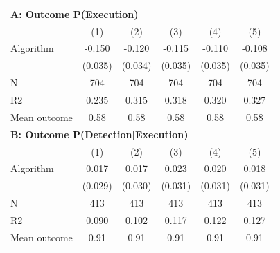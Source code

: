 \begin{tabular}{lccccc} \toprule
\multicolumn{6}{l}{\textbf{A: Outcome P(Execution)}} \\ \multicolumn{1}{l}{} & (1) & (2) & (3) & (4) & (5) \\ \midrule
Algorithm   &      -0.150\sym{***}&      -0.120\sym{***}&      -0.115\sym{***}&      -0.110\sym{***}&      -0.108\sym{***}\\
            &     (0.035)         &     (0.034)         &     (0.035)         &     (0.035)         &     (0.035)         \\
\midrule
N           &         704         &         704         &         704         &         704         &         704         \\
R2          &       0.235         &       0.315         &       0.318         &       0.320         &       0.327         \\
Mean outcome&        0.58         &        0.58         &        0.58         &        0.58         &        0.58         \\

\midrule \multicolumn{6}{l}{\textbf{B: Outcome P(Detection|Execution)}} \\ \multicolumn{1}{l}{} & (1) & (2) & (3) & (4) & (5) \\ \midrule
Algorithm   &       0.017         &       0.017         &       0.023         &       0.020         &       0.018         \\
            &     (0.029)         &     (0.030)         &     (0.031)         &     (0.031)         &     (0.031)         \\
\midrule
N           &         413         &         413         &         413         &         413         &         413         \\
R2          &       0.090         &       0.102         &       0.117         &       0.122         &       0.127         \\
Mean outcome&        0.91         &        0.91         &        0.91         &        0.91         &        0.91         \\


\end{tabular}

